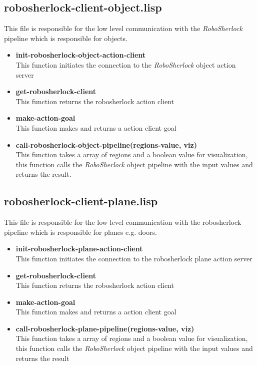 \documentclass[main.tex]{subfiles}
\begin{document}
		\subsection{robosherlock-client-object.lisp}
		\label{object-perceive}
		This file is responsible for the low level communication with the \textit{RoboSherlock} pipeline which is responsible for objects.
		\begin{itemize}
			\item \textbf{init-robosherlock-object-action-client} \\
			This function initiates the connection to the \textit{RoboSherlock} object action server
			\item \textbf{get-robosherlock-client} \\
			This function returns the robosherlock action client
			\item \textbf{make-action-goal} \\
			This function makes and returns a action client goal
			\item \textbf{call-robosherlock-object-pipeline(regions-value, viz)} \\
			This function takes a array of regions and a boolean value for visualization, this function calls the \textit{RoboSherlock} object pipeline with the input values and returns the result.
		\end{itemize}
		\subsection{robosherlock-client-plane.lisp}
		This file is responsible for the low level communication with the robosherlock pipeline which is responsible for planes e.g. doors.
		\begin{itemize}
			\item \textbf{init-robosherlock-plane-action-client} \\
			This function initiates the connection to the robosherlock plane action server
			\item \textbf{get-robosherlock-client} \\
			This function returns the robosherlock action client
			\item \textbf{make-action-goal} \\
			This function makes and returns a action client goal
			\item \textbf{call-robosherlock-plane-pipeline(regions-value, viz)} \\
			This function takes a array of regions and a boolean value for visualization, this function calls the \textit{RoboSherlock} object pipeline with the input values and returns the result
		\end{itemize}
	\endgroup
\end{document}
